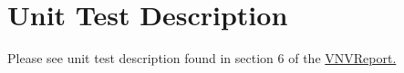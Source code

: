 \documentclass[12pt, titlepage]{article}
\begin{document}
\section{Unit Test Description}

Please see unit test description found in section 6 of the \href{https://github.com/OKKM-insights/OKKM.insights/blob/main/docs/VnVReport/VnVReport.pdf}{VNVReport.}







\end{document}
